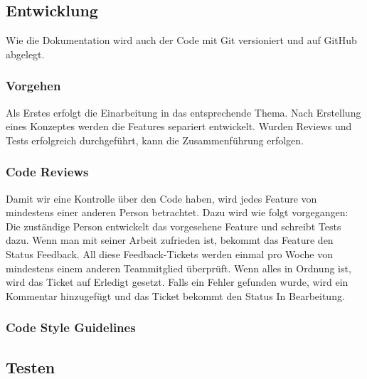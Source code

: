 \documentclass[a4,12pt]{scrartcl}
\begin{document}
\subsection{Entwicklung}
Wie die Dokumentation wird auch der Code mit Git versioniert und auf GitHub abgelegt.

\subsubsection{Vorgehen}
Als Erstes erfolgt die Einarbeitung in das entsprechende Thema.
Nach Erstellung eines Konzeptes werden die Features separiert entwickelt.
Wurden Reviews und Tests erfolgreich durchgeführt, kann die Zusammenführung erfolgen.


\subsubsection{Code Reviews}
Damit wir eine Kontrolle über den Code haben, wird jedes Feature von mindestens einer anderen Person betrachtet.
Dazu wird wie folgt vorgegangen: \\
Die zuständige Person entwickelt das vorgesehene Feature und schreibt Tests dazu.
Wenn man mit seiner Arbeit zufrieden ist, bekommt das Feature den Status Feedback.
All diese Feedback-Tickets werden einmal pro Woche von mindestens einem anderen Teammitglied überprüft.
Wenn alles in Ordnung ist, wird das Ticket auf Erledigt gesetzt.
Falls ein Fehler gefunden wurde, wird ein Kommentar hinzugefügt und das Ticket bekommt den Status In Bearbeitung.


\subsubsection{Code Style Guidelines}

\subsection{Testen}
\end{document}
